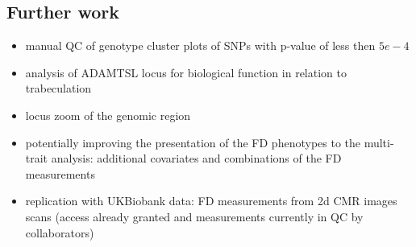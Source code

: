 \subsection{Further work}
\begin{itemize}
\item manual QC of genotype cluster plots of SNPs with p-value of less then $5e-4$
\item analysis of ADAMTSL locus for biological function in relation to trabeculation
\item locus zoom of the genomic region
\item potentially improving the presentation of the FD phenotypes to the multi-trait analysis: additional covariates and combinations of the FD measurements
\item replication with UKBiobank data: FD measurements from 2d CMR images scans (access already granted and measurements currently in QC by collaborators)
\end{itemize}
